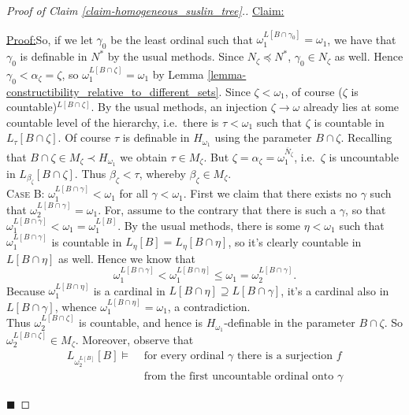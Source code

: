 \documentclass[11pt,a4paper]{report}
\theoremstyle{definition}
\theoremstyle{num.custom-title}
\theoremstyle{custom-title}
\newenvironment{claim}[1]{\par\noindent\underline{Claim#1:}\space}{} %
\newenvironment{claimproof}[1]{\par\noindent\underline{Proof:}\space#1}{\leavevmode\unskip\penalty9999 \hbox{}\nobreak\hfill\quad\hbox{$\blacksquare$}} %
\newcommand{\ol}{\overline}
\begin{document}
\begin{proof}[Proof of Claim \ref{claim-homogeneous_suslin_tree}.]
\begin{claim}{}
\begin{claimproof}
So, if we let $\gamma_0$ be the least ordinal such that $\omega_1^{L[B \cap \gamma_0]} = \omega_1$, we have that $\gamma_0$ is definable in $N^*$ by the usual methods. Since $N_\zeta \preceq N^*$, $\gamma_0 \in N_\zeta$ as well. Hence $\gamma_0 < \alpha_\zeta = \zeta$, so $\omega_1^{L[B \cap \zeta]} = \omega_1$ by Lemma \ref{lemma-constructibility_relative_to_different_sets}. Since $\zeta < \omega_1$, of course ($\zeta$ is countable)$^{L[B \cap \zeta]}$. By the usual methods, an injection $\zeta \to \omega$ already lies at some countable level of the hierarchy, i.e.\ there is $\tau < \omega_1$ such that $\zeta$ is countable in $L_\tau [B \cap \zeta]$. Of course $\tau$ is definable in $H_{\omega_1}$ using the parameter $B \cap \zeta$.
Recalling that $B \cap \zeta \in M_\zeta \prec H_{\omega_1}$ we obtain $\tau \in M_\zeta$. But $\zeta = \alpha_\zeta = \omega_1^{\ol{N}_\zeta}$, i.e.\ $\zeta$ is uncountable in $L_{\beta_\zeta}[B \cap \zeta]$. Thus $\beta_\zeta < \tau$, whereby $\beta_\zeta \in M_\zeta$.
\\[6pt]
\textsc{Case B:} $\omega_1^{L[B \cap \gamma]} < \omega_1$ for all $\gamma < \omega_1$. First we claim that there exists no $\gamma$ such that $\omega_2^{L[B \cap \gamma]} = \omega_1$. For, assume to the contrary that there is such a $\gamma$, so that $\omega_1^{L[B \cap \gamma]} < \omega_1 = \omega_1^{L[B]}$. By the usual methods, there is some $\eta < \omega_1$ such that $\omega_1^{L[B \cap \gamma]}$ is countable in $L_\eta [B] = L_\eta [B \cap \eta]$, so it's clearly countable in $L[B \cap \eta]$ as well.
Hence we know that
\[
\omega_1^{L[B \cap \gamma]} < \omega_1^{L[B \cap \eta]} \leq \omega_1 = \omega_2^{L[B \cap \gamma]}.
\]
Because $\omega_1^{L[B \cap \eta]}$ is a cardinal in $L[B \cap \eta] \supseteq L[B \cap \gamma]$, it's a cardinal also in $L[B \cap \gamma]$, whence $\omega_1^{L[B \cap \eta]} = \omega_1$, a contradiction.\\
Thus $\omega_2^{L[B \cap \zeta]}$ is countable, and hence is $H_{\omega_1}$-definable in the parameter $B \cap \zeta$. So $\omega_2^{L[B \cap \zeta]} \in M_\zeta$. Moreover, observe that
\begin{align*}
L_{\omega_2^{L[B]}}[B] \models & \text{ for every ordinal $\gamma$ there is a surjection $f$}\\
& \text{ from the first uncountable ordinal onto $\gamma$}
\end{align*}

\end{claimproof}
\end{claim}
\end{proof}
\end{document}
